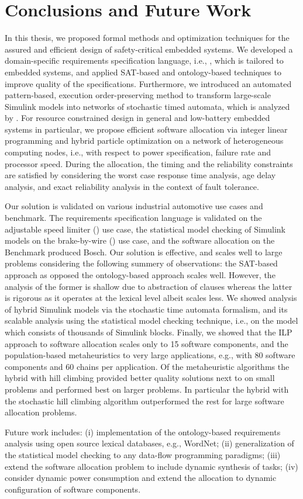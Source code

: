 \chapter{Conclusions and Future Work}
In this thesis, we proposed formal methods and optimization techniques for the assured and efficient design of safety-critical embedded systems. We developed a domain-specific requirements specification language, i.e., \resa, which is tailored to embedded systems, and applied SAT-based and ontology-based techniques to improve quality of the specifications. Furthermore, we introduced an automated pattern-based, execution order-preserving method to transform large-scale Simulink models into networks of stochastic timed automata, which is analyzed by \uppaalsmc. For resource constrained design in general and low-battery embedded systems in particular, we propose efficient software allocation via integer linear programming and hybrid particle optimization on a network of heterogeneous computing nodes, i.e., with respect to power specification, failure rate and processor speed. During the allocation, the timing and the reliability constraints are satisfied by considering the worst case response time analysis, age delay analysis, and exact reliability analysis in the context of fault tolerance.

Our solution is validated on various industrial automotive use cases and benchmark. The requirements specification language is validated on the adjustable speed limiter (\asl) use case, the statistical model checking of Simulink models on the brake-by-wire (\bbw) use case, and the software allocation on the \autosar{} Benchmark produced Bosch. Our solution is effective, and scales well to large problems considering the following summery of observations: the SAT-based approach as opposed the ontology-based approach scales well. However, the analysis of the former is shallow due to abstraction of clauses whereas the latter is rigorous as it operates at the lexical level albeit scales less. We showed analysis of hybrid Simulink models via the stochastic time automata formalism, and its scalable analysis using the statistical model checking technique, i.e., on the \bbw{} model which consists of thousands of Simulink blocks. Finally, we showed that the ILP approach to software allocation scales only to 15 software components, and the population-based metaheuristics to very large applications, e.g., with 80 software components and 60 chains per application. Of the metaheuristic algorithms the hybrid \pso{} with hill climbing provided better quality solutions next to \ilp{} on small problems and performed best on larger problems. In particular the hybrid \pso{} with the stochastic hill climbing algorithm outperformed the rest for large software allocation problems.

Future work includes: (i) implementation of the ontology-based requirements analysis using open source lexical databases, e.g., WordNet; (ii) generalization of the statistical model checking to any data-flow programming paradigms; (iii) extend the software allocation problem to include dynamic synthesis of tasks; (iv) consider dynamic power consumption and extend the allocation to dynamic configuration of software components.

